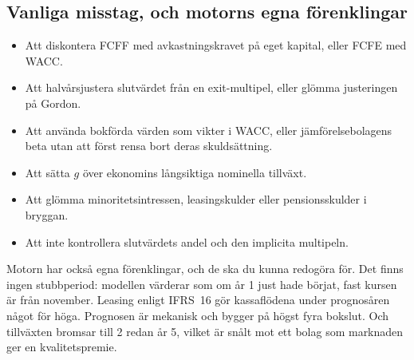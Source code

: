 \subsection{Vanliga misstag, och motorns egna förenklingar}

\begin{vanligtfel}
\begin{itemize}[leftmargin=1.2em]
  \item Att diskontera FCFF med avkastningskravet på eget kapital, eller FCFE med WACC.
  \item Att halvårsjustera slutvärdet från en exit-multipel, eller glömma justeringen på Gordon.
  \item Att använda bokförda värden som vikter i WACC, eller jämförelsebolagens beta utan att
    först rensa bort deras skuldsättning.
  \item Att sätta $g$ över ekonomins långsiktiga nominella tillväxt.
  \item Att glömma minoritetsintressen, leasingskulder eller pensionsskulder i bryggan.
  \item Att inte kontrollera slutvärdets andel och den implicita multipeln.
\end{itemize}
\end{vanligtfel}

Motorn har också egna förenklingar, och de ska du kunna redogöra för. Det finns ingen
stubbperiod: modellen värderar som om år 1 just hade börjat, fast kursen är från november.
Leasing enligt IFRS~16 gör kassaflödena under prognosåren något för höga. Prognosen är mekanisk
och bygger på högst fyra bokslut. Och tillväxten bromsar till 2\pct{} redan år 5, vilket är
snålt mot ett bolag som marknaden ger en kvalitetspremie.
